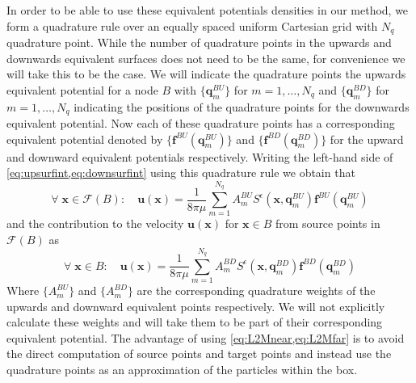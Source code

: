 In order to be able to use these equivalent potentials densities in our method, we form a quadrature rule over an equally spaced uniform Cartesian grid with $N_q$ quadrature point. While the number of quadrature points in the upwards and downwards equivalent surfaces does not need to be the same, for convenience we will take this to be the case. We will indicate the quadrature points the upwards equivalent potential for a node $B$ with $\{\bm{q}^{BU}_m\}$ for $m=1,\dots,N_q$ and $\{\bm{q}^{BD}_m\}$ for $m=1,\dots,N_q$ indicating the positions of the quadrature points for the downwards equivalent potential. Now each of these quadrature points has a corresponding equivalent potential denoted by $\{\bm{f}^{BU}(\bm{q}^{BU}_m)\}$ and $\{\bm{f}^{BD}(\bm{q}^{BD}_m)\}$ for the upward and downward equivalent potentials respectively. Writing the left-hand side of \cref{eq:upsurfint,eq:downsurfint} using this quadrature rule we obtain that
\begin{equation}
\label{eq:L2Mfar}
    \forall \;\bm{x} \in \mathcal{F}(B): \quad \bm{u}(\bm{x})= \frac{1}{8 \pi \mu} \sum_{m=1}^{N_{q}} A_{m}^{BU} S^\epsilon\left(\bm{x}, \bm{q}_{m}^{B U}\right) \bm{f}^{B U}\left(\bm{q}_{m}^{B U}\right)
\end{equation}
and the contribution to the velocity $\bm{u}(\bm{x})$ for $\bm{x} \in B$ from source points in $\mathcal{F}(B)$ as
\begin{equation}
\label{eq:L2Mnear}
    \forall \;\bm{x} \in B: \quad \bm{u}(\bm{x})= \frac{1}{8 \pi \mu} \sum_{m=1}^{N_{q}} A_{m}^{BD} S^\epsilon\left(\bm{x}, \bm{q}_{m}^{B D}\right) \bm{f}^{B D}\left(\bm{q}_{m}^{B D}\right)
\end{equation}
Where $\{A_{m}^{BU}\}$ and $\{A_{m}^{BD}\}$ are the corresponding quadrature weights of the upwards and downward equivalent points respectively. We will not explicitly calculate these weights and will take them to be part of their corresponding equivalent potential. The advantage of using \cref{eq:L2Mnear,eq:L2Mfar} is to avoid the direct computation of source points and target points and instead use the quadrature points as an approximation of the particles within the box.

